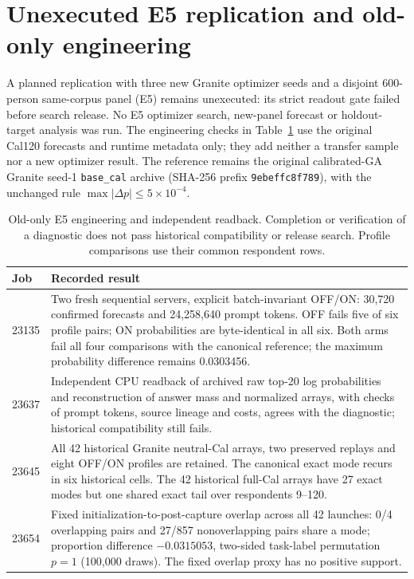 \section{Unexecuted E5 replication and old-only engineering}\label{sec:e5-engineering}
A planned replication with three new Granite optimizer seeds and a disjoint
600-person same-corpus panel (E5) remains unexecuted: its strict readout gate
failed before search release. No E5 optimizer search, new-panel forecast or
holdout-target analysis was run. The engineering checks in
Table~\ref{tab:e5-engineering} use the original Cal120 forecasts and runtime
metadata only; they add neither a transfer sample nor a new optimizer result.
The reference remains the original calibrated-GA Granite seed-1
\texttt{base\_cal} archive (SHA-256 prefix \texttt{9ebeffc8f789}), with the
unchanged rule $\max|\Delta p|\leq5\times10^{-4}$.

\begin{table}[H]\centering\footnotesize
\caption{Old-only E5 engineering and independent readback. Completion or
verification of a diagnostic does not pass historical compatibility or release
search. Profile comparisons use their common respondent rows.}
\label{tab:e5-engineering}
\begin{tabular}{@{}p{}p{}@{}}\toprule
Job & Recorded result\\\midrule
23135 & Two fresh sequential servers, explicit batch-invariant OFF/ON:
30,720 confirmed forecasts and 24,258,640 prompt tokens.
OFF fails five of six profile pairs; ON probabilities are byte-identical
in all six.
Both arms fail all four comparisons with the canonical reference;
the maximum probability difference remains 0.0303456.\\
23637 & Independent CPU readback of archived raw top-20 log probabilities
and reconstruction of answer mass and normalized arrays, with checks of
prompt tokens, source lineage and costs, agrees with the diagnostic;
historical compatibility still fails.\\
23645 & All 42 historical Granite neutral-Cal arrays, two preserved replays
and eight OFF/ON profiles are retained. The canonical exact mode recurs in
six historical cells. The 42 historical full-Cal arrays have 27 exact modes
but one shared exact tail over respondents 9--120.\\
23654 & Fixed initialization-to-post-capture overlap across all 42 launches:
0/4 overlapping pairs and 27/857 nonoverlapping pairs share a mode;
proportion difference $-0.0315053$, two-sided task-label permutation $p=1$
(100,000 draws). The fixed overlap proxy has no positive support.\\\bottomrule
\end{tabular}\end{table}

